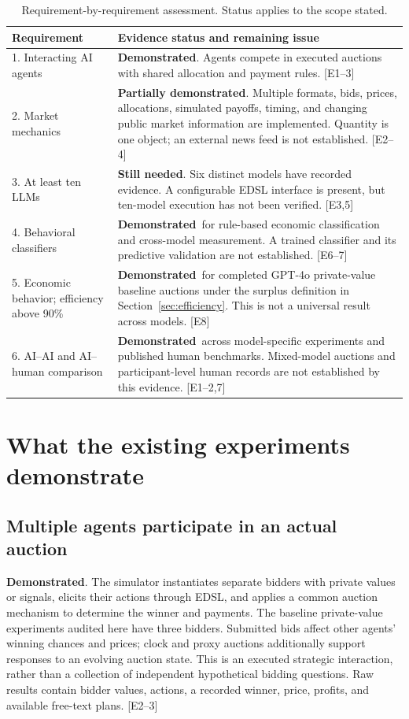 \documentclass[11pt,letterpaper]{article}
\newcommand{\yes}{\textcolor{supported}{\textbf{Demonstrated}}}
\newcommand{\partiallydemonstrated}{\textcolor{conditional}{\textbf{Partially demonstrated}}}
\newcommand{\needed}{\textcolor{missing}{\textbf{Still needed}}}
\newcommand{\evidence}[1]{\textnormal{[E#1]}}
\begin{document}
\begin{table}[H]
\small
\caption{Requirement-by-requirement assessment. Status applies to the scope stated.}
\label{tab:assessment}
\begin{tabularx}{\textwidth}{@{}L{0.25\textwidth}Y@{}}
\toprule
Requirement & Evidence status and remaining issue \\
. Interacting AI agents & \yes. Agents compete in executed auctions with shared allocation and payment rules. \evidence{1--3} \\
2. Market mechanics & \partiallydemonstrated. Multiple formats, bids, prices, allocations, simulated payoffs, timing, and changing public market information are implemented. Quantity is one object; an external news feed is not established. \evidence{2--4} \\
3. At least ten LLMs & \needed. Six distinct models have recorded evidence. A configurable EDSL interface is present, but ten-model execution has not been verified. \evidence{3,5} \\
4. Behavioral classifiers & \yes\ for rule-based economic classification and cross-model measurement. A trained classifier and its predictive validation are not established. \evidence{6--7} \\
5. Economic behavior; efficiency above 90\% & \yes\ for completed GPT-4o private-value baseline auctions under the surplus definition in Section~\ref{sec:efficiency}. This is not a universal result across models. \evidence{8} \\
6. AI--AI and AI--human comparison & \yes\ across model-specific experiments and published human benchmarks. Mixed-model auctions and participant-level human records are not established by this evidence. \evidence{1--2,7} \\
\bottomrule
\end{tabularx}
\end{table}

\section{What the existing experiments demonstrate}

\subsection{Multiple agents participate in an actual auction}

\yes. The simulator instantiates separate bidders with private values or
signals, elicits their actions through EDSL, and applies a common auction
mechanism to determine the winner and payments. The baseline private-value
experiments audited here have three bidders. Submitted bids affect other
agents' winning chances and prices; clock and proxy auctions additionally
support responses to an evolving auction state. This is an executed strategic
interaction, rather than a collection of independent hypothetical bidding
questions. Raw results contain bidder values, actions, a recorded winner,
price, profits, and available free-text plans. \evidence{2--3}
\end{document}
